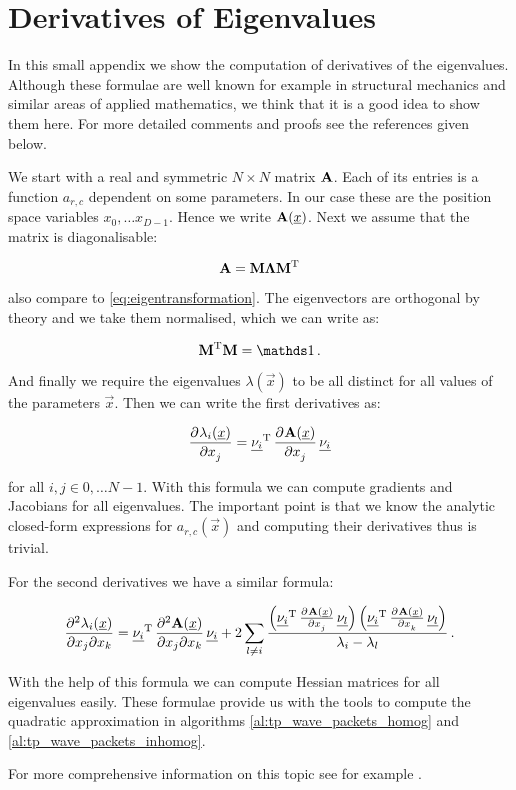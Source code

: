 \chapter{Derivatives of Eigenvalues}
\label{ch:deriv_ew}


In this small appendix we show the computation of derivatives of the eigenvalues.
Although these formulae are well known for example in structural mechanics
and similar areas of applied mathematics, we think that it is a good idea to show
them here. For more detailed comments and proofs see the references given below.

We start with a real and symmetric $N \times N$ matrix $\mathbf{A}$. Each
of its entries is a function $a_{r,c}$ dependent on some parameters.
In our case these are the position space variables $x_0, \ldots x_{D-1}$.
Hence we write $\mathbf{A}(\underline{x})$. Next we assume that the matrix is
diagonalisable:

\begin{equation}
  \mathbf{A} = \mathbf{M} \mathbf{\Lambda} \mathbf{M}{}^{\textnormal{T}}
\end{equation}

also compare to \eqref{eq:eigentransformation}. The eigenvectors are orthogonal
by theory and we take them normalised, which we can write as:

\begin{equation}
  \mat{M}\T \mat{M} = \id \,.
\end{equation}

And finally we require the eigenvalues $\lambda(\vec{x})$ to be all distinct
for all values of the parameters $\vec{x}$. Then we can write the first derivatives
as:

\begin{equation}
  \frac{\partial^{}\lambda_i(\underline{x})}{\partial x_j^{}} = \underline{\nu_i}{}^{\textnormal{T}} \, \frac{\partial^{}\mathbf{A}(\underline{x})}{\partial x_j^{}} \, \underline{\nu_i}
\end{equation}

for all $i, j \in 0, \ldots N-1$. With this formula we can compute gradients
and Jacobians for all eigenvalues. The important point is that we know the
analytic closed-form expressions for $a_{r,c}(\vec{x})$ and computing their
derivatives thus is trivial.

For the second derivatives we have a similar formula:

\begin{equation}
  \frac{\partial^2 \lambda_i(\underline{x})}{\partial x_j \partial x_k} =
  \underline{\nu_i}{}^{\textnormal{T}} \, \frac{\partial^2 \mathbf{A}(\underline{x})}{\partial x_j \partial x_k} \, \underline{\nu_i}
  + 2 \sum_{l \neq i} \frac{
    \left(\underline{\nu_i}{}^{\textnormal{T}} \, \frac{\partial^{}\mathbf{A}(\underline{x})}{\partial x_j^{}} \, \underline{\nu_l}\right)
    \left(\underline{\nu_i}{}^{\textnormal{T}} \, \frac{\partial^{}\mathbf{A}(\underline{x})}{\partial x_k^{}} \, \underline{\nu_l}\right)
  }{\lambda_i - \lambda_l} \,.
\end{equation}

With the help of this formula we can compute Hessian matrices for all eigenvalues easily.
These formulae provide us with the tools to compute the quadratic approximation
in algorithms \ref{al:tp_wave_packets_homog} and \ref{al:tp_wave_packets_inhomog}.

For more comprehensive information on this topic see for example \cite{L_eigenvalues, MH_eigenvalues, OW_eigenvalues}.
